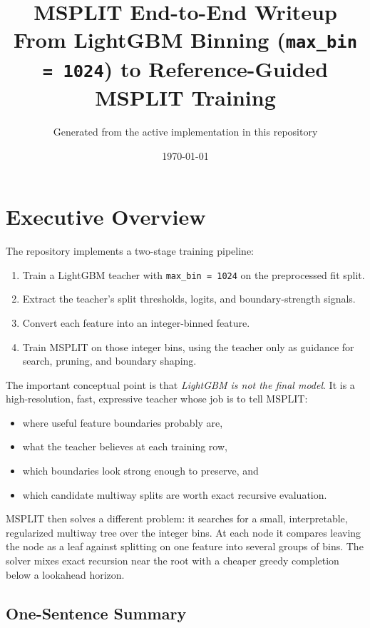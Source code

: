 \documentclass[11pt]{article}
\title{MSPLIT End-to-End Writeup\\[4pt]
\large From LightGBM Binning (\texttt{max\_bin = 1024}) to Reference-Guided MSPLIT Training}
\author{Generated from the active implementation in this repository}
\date{\today}
\begin{document}
\maketitle
\tableofcontents
\newpage

\section{Executive Overview}

The repository implements a two-stage training pipeline:

\begin{enumerate}
\item Train a LightGBM teacher with \texttt{max\_bin = 1024} on the preprocessed fit split.
\item Extract the teacher's split thresholds, logits, and boundary-strength signals.
\item Convert each feature into an integer-binned feature.
\item Train MSPLIT on those integer bins, using the teacher only as guidance for search, pruning, and boundary shaping.
\end{enumerate}

The important conceptual point is that \emph{LightGBM is not the final model}. It is a high-resolution, fast, expressive teacher whose job is to tell MSPLIT:

\begin{itemize}
\item where useful feature boundaries probably are,
\item what the teacher believes at each training row,
\item which boundaries look strong enough to preserve, and
\item which candidate multiway splits are worth exact recursive evaluation.
\end{itemize}

MSPLIT then solves a different problem: it searches for a small, interpretable, regularized multiway tree over the integer bins. At each node it compares leaving the node as a leaf against splitting on one feature into several groups of bins. The solver mixes exact recursion near the root with a cheaper greedy completion below a lookahead horizon.

\subsection{One-Sentence Summary}
\end{document}
